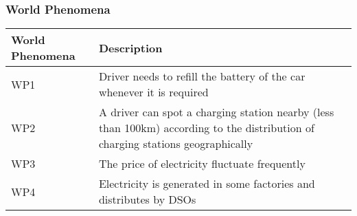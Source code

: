 \documentclass{article}
\begin{document}
\subsubsection{World Phenomena}
\begin{tabularx}{1\textwidth} { 
  | >{\raggedright\arraybackslash}X 
  | >{\raggedright\arraybackslash}X
  | }
\hline
\textbf {World Phenomena} & \textbf{Description} \\ 
\hline
WP1 & Driver needs to refill the battery of the car whenever it is required \\ 
\hline
WP2 & A driver can spot a charging station nearby (less than 100km) according to the distribution of charging stations geographically \\
\hline
WP3 & The price of electricity fluctuate frequently\\
\hline
WP4 & Electricity is generated in some factories and distributes by DSOs \\
\hline
\end{tabularx}
\end{document}

